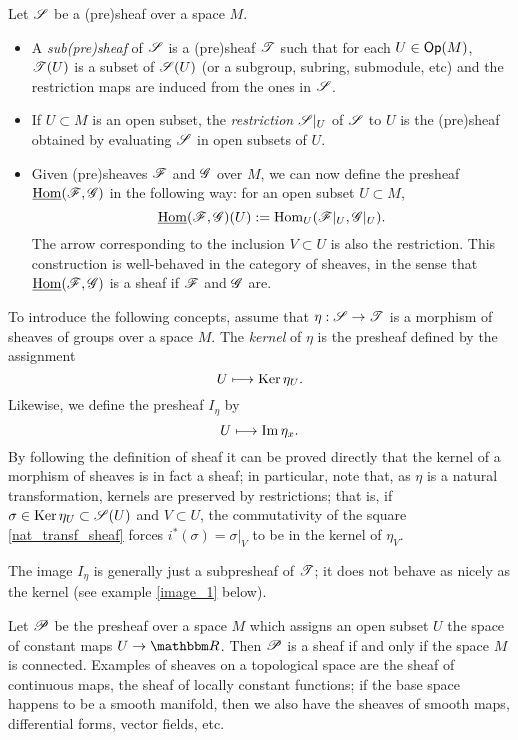 \begin{defi}
Let $\mathscr{S}$ be a (pre)sheaf over a space $M$.
\begin{itemize}
\item A \emph{sub(pre)sheaf} of $\mathscr{S}$ is a (pre)sheaf $\mathscr{T}$ such that for each $U\in \mathsf{Op}(M)$, $\mathscr{T}(U)$ is a subset of $\mathscr{S}(U)$ (or a subgroup, subring, submodule, etc) and the restriction maps are induced from the ones in $\mathscr{S}$. 
\item If $U\subset M$ is an open subset, the \emph{restriction} $\mathscr{S}|_U$ of $\mathscr{S}$ to $U$ is the (pre)sheaf obtained by evaluating $\mathscr{S}$ in open subsets of $U$.
\item Given (pre)sheaves $\mathscr{F}$ and $\mathscr{G}$ over $M$, we can now define the presheaf $\underline{\operatorname{Hom}}(\mathscr{F},\mathscr{G})$ in the following way: for an open subset $U\subset M$,
$$\underline{\operatorname{Hom}}(\mathscr{F},\mathscr{G})(U):=\operatorname{Hom}_U(\mathscr{F}|_U,\mathscr{G}|_U).$$
The arrow corresponding to the inclusion $V\subset U$ is also the restriction. This construction is well-behaved in the category of sheaves, in the sense that $\underline{\operatorname{Hom}}(\mathscr{F},\mathscr{G})$ is a sheaf if $\mathscr{F}$ and $\mathscr{G}$ are.
\end{itemize}
\end{defi}

To introduce the following concepts, assume that $\eta :\mathscr{S}\to \mathscr{T}$ is a morphism of sheaves of groups over a space $M$. The \emph{kernel} of $\eta$ is the presheaf defined by the assignment
$$U\longmapsto \operatorname{Ker}\eta_U.$$
Likewise, we define the presheaf $I_{\eta}$ by
$$U\longmapsto \operatorname{Im}\eta_x.$$
By following the definition of sheaf it can be proved directly that the kernel of a morphism of sheaves is in fact a sheaf; in particular, note that, as $\eta$ is a natural transformation, kernels are preserved by restrictions; that is, if $\sigma \in \operatorname{Ker}\eta_U\subset \mathscr{S}(U)$ and $V\subset U$, the commutativity of the square \eqref{nat_transf_sheaf} forces $i^*(\sigma )=\sigma|_V$ to be in the kernel of $\eta_V$.

The image $I_{\eta}$ is generally just a subpresheaf of $\mathscr{T}$; it does not behave as nicely as the kernel (see example \ref{image_1} below).

\begin{ej}
Let $\mathscr{P}$ be the presheaf over a space $M$ which assigns an open subset $U$ the space of constant maps $U\to \re$. Then $\mathscr{P}$ is a sheaf if and only if the space $M$ is connected. Examples of sheaves on a topological space are the sheaf of continuous maps, the sheaf of locally constant functions; if the base space happens to be a smooth manifold, then we also have the sheaves of smooth maps, differential forms, vector fields, etc.
\end{ej}


